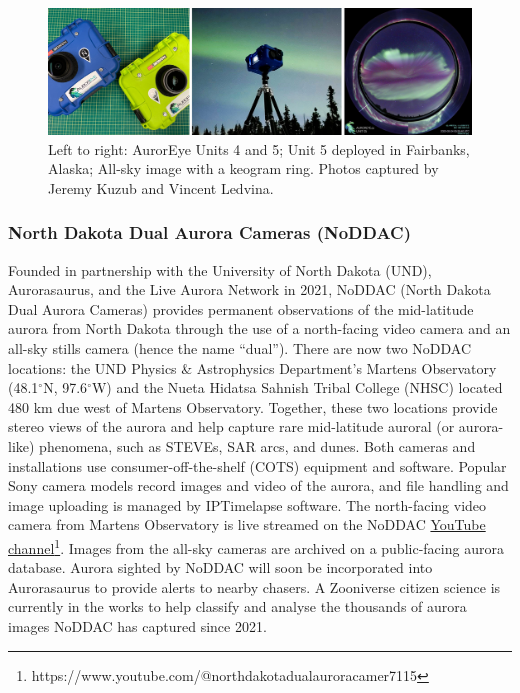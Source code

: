 \documentclass{article}
\begin{document}
\begin{figure}
  \includegraphics[width=\linewidth]{Fig15_AurorEye.jpg}
  \caption{Left to right: AurorEye Units 4 and 5; Unit 5 deployed in Fairbanks, Alaska; All-sky image with a keogram ring. Photos captured by Jeremy Kuzub and Vincent Ledvina.}
  \label{fig:auroreye}
\end{figure}

\subsubsection{North Dakota Dual Aurora Cameras (NoDDAC)}

Founded in partnership with the University of North Dakota (UND), Aurorasaurus, and the Live Aurora Network in 2021, NoDDAC (North Dakota Dual Aurora Cameras) provides permanent observations of the mid-latitude aurora from North Dakota through the use of a north-facing video camera and an all-sky stills camera (hence the name ``dual''). There are now two NoDDAC locations: the UND Physics \& Astrophysics Department's Martens Observatory (48.1$^{\circ}$N, 97.6$^{\circ}$W) and the Nueta Hidatsa Sahnish Tribal College (NHSC) located 480 km due west of Martens Observatory. Together, these two locations provide stereo views of the aurora and help capture rare mid-latitude auroral (or aurora-like) phenomena, such as STEVEs, SAR arcs, and dunes. Both cameras and installations use consumer-off-the-shelf (COTS) equipment and software. Popular Sony camera models record images and video of the aurora, and file handling and image uploading is managed by IPTimelapse software. The north-facing video camera from Martens Observatory is live streamed on the NoDDAC \href{https://www.youtube.com/@northdakotadualauroracamer7115}{YouTube channel}\footnote{https://www.youtube.com/@northdakotadualauroracamer7115}. Images from the all-sky cameras are archived on a public-facing aurora database. Aurora sighted by NoDDAC will soon be incorporated into Aurorasaurus to provide alerts to nearby chasers. A Zooniverse citizen science is currently in the works to help classify and analyse the thousands of aurora images NoDDAC has captured since 2021.
\end{document}

